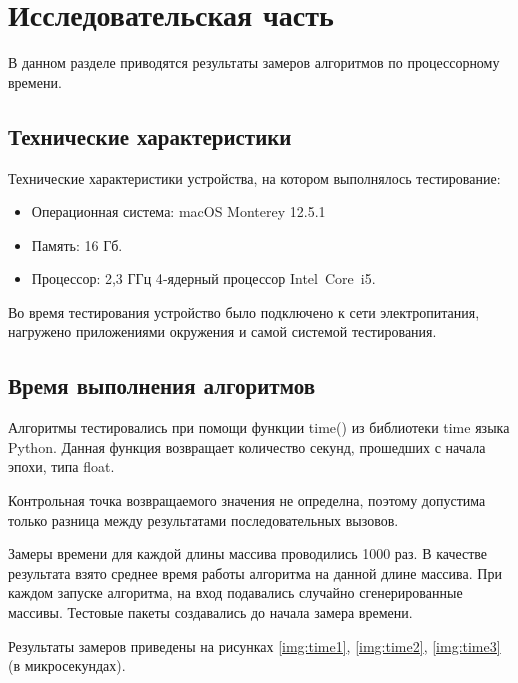 \chapter{Исследовательская часть}

В данном разделе приводятся результаты замеров алгоритмов по процессорному времени.

\section{Технические характеристики}

Технические характеристики устройства, на котором выполнялось тестирование:

\begin{itemize}
	\item Операционная система: macOS Monterey 12.5.1 
	\item Память: 16 Гб.
	\item Процессор: 2,3 ГГц 4‑ядерный процессор Intel Core i5.
\end{itemize}

Во время тестирования устройство было подключено к сети электропитания, нагружено приложениями окружения и самой  системой тестирования.

\section{Время выполнения алгоритмов}

Алгоритмы тестировались при помощи функции time() из библиотеки time языка Python. Данная функция возвращает количество секунд, прошедших с начала эпохи, типа float.

Контрольная точка возвращаемого значения не определна, поэтому допустима только разница между результатами последовательных вызовов.

Замеры времени для каждой длины массива проводились 1000 раз. В качестве результата взято среднее время работы алгоритма на данной длине массива. При каждом запуске алгоритма, на вход подавались случайно сгенерированные массивы. Тестовые пакеты создавались до начала замера времени.

Результаты замеров приведены на рисунках \ref{img:time1}, \ref{img:time2}, \ref{img:time3} (в микросекундах).


